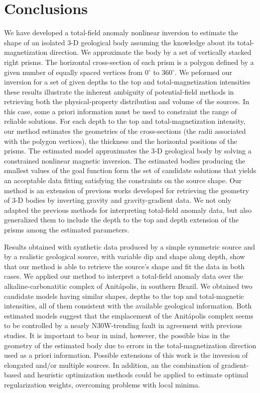 \section{Conclusions}

We have developed a total-field anomaly nonlinear inversion to estimate the shape 
of an isolated 3-D geological body assuming the knowledge about its 
total-magnetization direction. We approximate the body by a set of vertically 
stacked right prisms. The horizontal cross-section of each prism is a polygon 
defined by a given number of equally spaced vertices from 0$^\circ$ to 360$^\circ$. 
We peformed our inversion for a set of given depths to the top and total-magnetization 
intensities these results illustrate the inherent ambiguity of potential-field methods in 
retrieving both the physical-property distribution and volume of the sources. 
In this case, some a priori information must 
be used to constraint the range of reliable solutions. For each depth to the top and total-magnetization intensity,
our method estimates the geometries of the cross-sections (the radii associated with the polygon vertices), the thickness and 
the horizontal positions of the prisms. The estimated model approximates the 3-D geological body by 
solving a constrained nonlinear magnetic inversion.
The estimated bodies producing the smallest values of the goal function form the 
set of candidate solutions that yields an acceptable data fitting satisfying the 
constraints on the source shape.
Our method is an extension of previous works developed for retrieving the geometry 
of 3-D bodies by inverting gravity and gravity-gradient data. 
We not only adapted the previous methods for interpreting total-field anomaly data,
but also generalized them to include the depth to the top and depth extension of 
the prisms among the estimated parameters.

Results obtained with synthetic data produced by a simple symmetric source 
and by a realistic geological source, with variable dip and shape along depth,
show that our method is able to retrieve the source's shape and fit the data
in both cases.
We applied our method to interpret a total-field anomaly data over the 
alkaline-carbonatitic complex of Anit{\'a}polis, in southern Brazil. 
We obtained two candidate models having similar shapes, depths to the top and 
total-magnetic intensities, all of them consistent with the available 
geological information. Both estimated models suggest that the emplacement of the 
Anit{\'a}polis complex seems to be controlled by a nearly N30W-trending fault
in agreement with previous studies.
It is important to bear in mind, however, the possible bias in the geometry of the
estimated body due to errors in the total-magnetization direction used as 
a priori information.
Possible extensions of this work is the inversion of elongated and/or multiple 
sources. In addition, an the combination of gradient-based and heuristic optimization 
methods could be applied to estimate optimal regularization weights, 
overcoming problems with local minima.